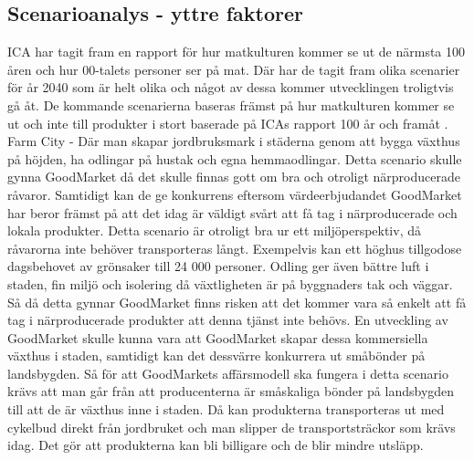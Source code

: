 \documentclass[10pt,a4paper,oneside]{article}
\begin{document}
\subsection{Scenarioanalys  - yttre faktorer}

ICA har tagit fram en rapport för hur matkulturen kommer se ut de närmsta 100 åren och hur 00-talets personer ser på mat. Där har de tagit fram olika scenarier för år 2040 som är helt olika och något av dessa kommer utvecklingen troligtvis gå åt. De kommande scenarierna baseras främst på hur matkulturen kommer se ut och inte till produkter i stort baserade på ICAs rapport 100 år och framåt \cite{ICA3}. \\ 

Farm City - Där man skapar jordbruksmark i städerna genom att bygga växthus på höjden, ha odlingar på hustak och egna hemmaodlingar. Detta scenario skulle gynna GoodMarket då det skulle finnas gott om bra och otroligt närproducerade råvaror. Samtidigt kan de ge konkurrens eftersom värdeerbjudandet GoodMarket har beror främst på att det idag är väldigt svårt att få tag i närproducerade och lokala produkter. Detta scenario är otroligt bra ur ett miljöperspektiv, då råvarorna inte behöver transporteras långt. Exempelvis kan ett höghus tillgodose dagsbehovet av grönsaker till 24 000 personer. Odling ger även bättre luft i staden, fin miljö och isolering då växtligheten är på byggnaders tak och väggar. Så då detta gynnar GoodMarket finns risken att det kommer vara så enkelt att få tag i närproducerade produkter att denna tjänst inte behövs. En utveckling av GoodMarket skulle kunna vara att GoodMarket skapar dessa kommersiella växthus i staden, samtidigt kan det dessvärre konkurrera ut småbönder på landsbygden. Så för att GoodMarkets affärsmodell ska fungera i detta scenario krävs att man går från att producenterna är småskaliga bönder på landsbygden till att de är växthus inne i staden. Då kan produkterna transporteras ut med cykelbud direkt från jordbruket och man slipper de transportsträckor som krävs idag. Det gör att produkterna kan bli billigare och de blir mindre utsläpp. \\
\end{document}
